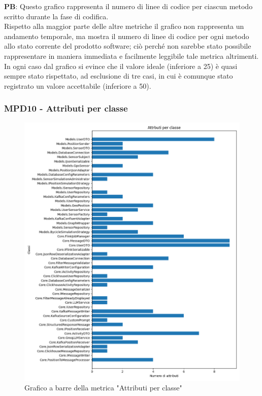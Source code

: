 \documentclass[10pt]{article}
\begin{document}
\begin{justify}
\textbf{PB}: Questo grafico rappresenta il numero di linee di codice per ciascun metodo scritto durante la fase di codifica.\\
Rispetto alla maggior parte delle altre metriche il grafico non rappresenta un andamento temporale, ma mostra il numero di linee di codice per ogni metodo allo stato
corrente del prodotto software; ciò perché non sarebbe stato possibile rappresentare in maniera immediata e  facilmente leggibile tale metrica altrimenti.\\
In ogni caso dal grafico si evince che il valore ideale (inferiore a 25) è quasi sempre stato rispettato, ad esclusione di tre casi, in cui è comunque stato registrato
un valore accettabile (inferiore a 50).\\






\subsubsection{MPD10 - Attributi per classe}

\begin{figure}[H]
  \centering
  \includegraphics[width=0.9\linewidth]{metrics_attributes.png}
  \caption{Grafico a barre della metrica "Attributi per classe"}
\end{figure}


\end{justify}
\end{document}
